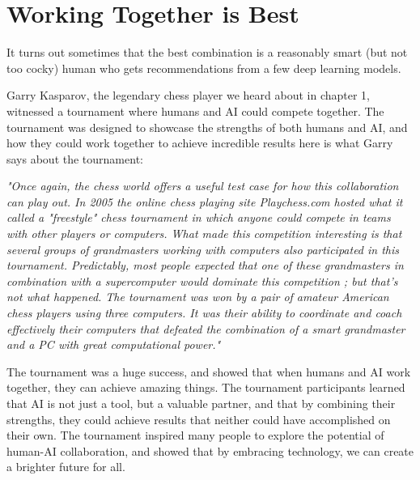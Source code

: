 \section{Working Together is Best}

It turns out sometimes that the best combination is a reasonably smart (but not too cocky) human who gets recommendations from a few deep learning models. 

Garry Kasparov, the legendary chess player we heard about in chapter 1, witnessed a tournament where humans and AI could compete together. The tournament was designed to showcase the strengths of both humans and AI, and how they could work together to achieve incredible results here is what Garry says about the tournament:

\textit{"Once again, the chess world offers a useful test case for how this collaboration can play out. In 2005 the online chess playing site Playchess.com hosted what it called a "freestyle" chess tournament in which anyone could compete in teams with other players or computers. What made this competition interesting is that several groups of grandmasters working with computers also participated in this tournament. Predictably, most people expected that one of these grandmasters in combination with a supercomputer would dominate this competition ; but that's not what happened. The tournament was won by a pair of amateur American chess players using three computers. It was their ability to coordinate and coach effectively their computers that defeated the combination of a smart grandmaster and a PC with great computational power."}

The tournament was a huge success, and showed that when humans and AI work together, they can achieve amazing things. The tournament participants learned that AI is not just a tool, but a valuable partner, and that by combining their strengths, they could achieve results that neither could have accomplished on their own. The tournament inspired many people to explore the potential of human-AI collaboration, and showed that by embracing technology, we can create a brighter future for all.

